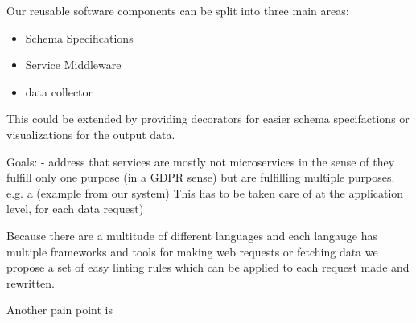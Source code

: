 Our reusable software components can be split into three main areas: 

\begin{itemize}
    \item Schema Specifications
    \item Service Middleware 
    \item data collector 
\end{itemize}



This could be extended by providing decorators for easier schema specifactions or visualizations for the output data. 

    
    

Goals: 
 - address that services are mostly not microservices in the sense of they fulfill only one purpose (in a GDPR sense) but are fulfilling multiple purposes. e.g. a (example from our system) This has to be taken care of at the application level, for each data request) 
 
 Because there are a multitude of different languages and each langauge has multiple frameworks and tools for making web requests or fetching data we propose a set of easy linting rules which can be applied to each request made and rewritten. 
 
 
 Another pain point is 